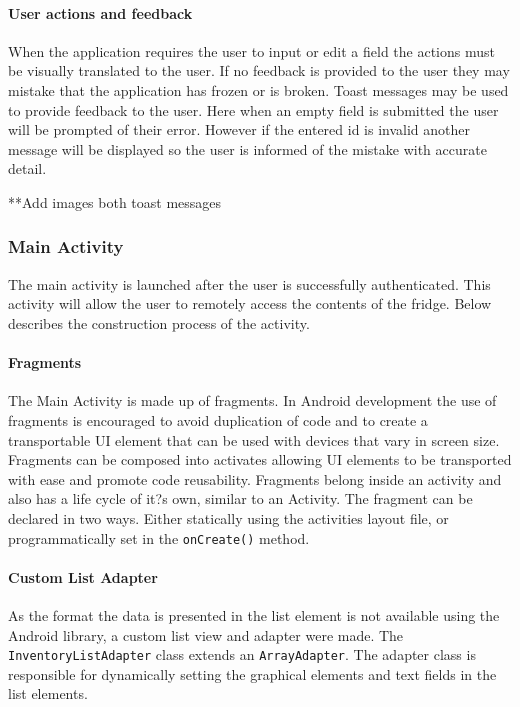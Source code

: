 \documentclass[a4paper, 11pt]{article}
\begin{document}
\paragraph{User actions and feedback}
When the application requires the user to input or edit a field the actions must be visually translated to the user. If no feedback is provided to the user they may mistake that the application has frozen or is broken. Toast messages may be used to provide feedback to the user. Here when an empty field is submitted the user will be prompted of their error. However if the entered id is invalid another message will be displayed so the user is informed of the mistake with accurate detail. 

**Add images both toast messages

\subsubsection{Main Activity}
The main activity is launched after the user is successfully authenticated. This activity will allow the user to remotely access the contents of the fridge. Below describes the construction process of the activity. 

\paragraph{Fragments} The Main Activity is made up of fragments. In Android development the use of fragments is encouraged to avoid duplication of code and to create a transportable UI element that can be used with devices that vary in screen size. Fragments can be composed into activates allowing UI elements to be transported with ease and promote code reusability. Fragments belong inside an activity and also has a life cycle of it?s own, similar to an Activity. The fragment can be declared in two ways. Either statically using the activities layout file, or programmatically set in the \texttt{onCreate()} method.  	

\paragraph{Custom List Adapter} 
As the format the data is presented in the list element is not available using the Android library, a custom list view and adapter were made. The \texttt{InventoryListAdapter} class extends an \texttt{ArrayAdapter}. The adapter class is responsible for dynamically setting the graphical elements and text fields in the list elements. 
\end{document}
